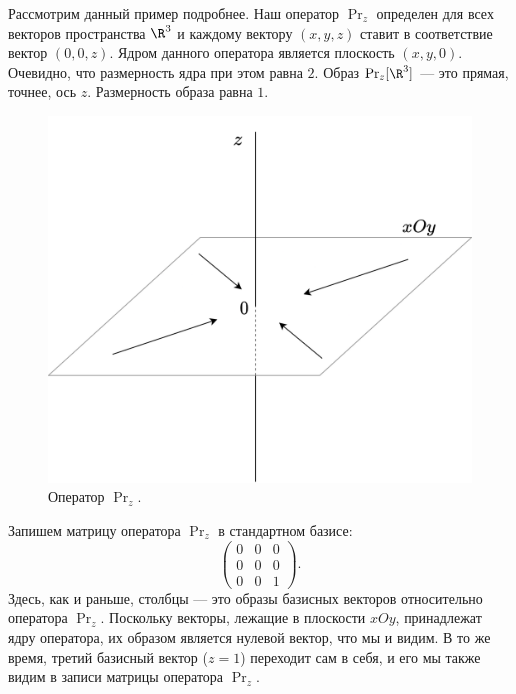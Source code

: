\begin{enumerate}
Рассмотрим данный пример подробнее. Наш оператор $\Pr_z$ определен для всех векторов пространства $\R^3$ и каждому вектору $(x,y,z)$ ставит в соответствие вектор $(0,0,z)$. Ядром данного оператора является плоскость $(x,y,0)$. Очевидно, что размерность ядра при этом равна $2$. Образ $\Pr_z[\R^3]$ --- это прямая, точнее, ось $z$. Размерность образа равна $1$.

\begin{figure}[hbt!]
\begin{center}
\includegraphics[scale=0.2]{ProjZ.png}
\end{center}\caption{Оператор $\Pr_z$.}\label{ProjZ}
\end{figure}

Запишем матрицу оператора $\Pr_z$ в стандартном базисе:
$$
\begin{pmatrix}
0 & 0 & 0 \\
0 & 0 & 0 \\
0 & 0 & 1 
\end{pmatrix}.
$$
Здесь, как и раньше, столбцы --- это образы базисных векторов относительно оператора $\Pr_z$. Поскольку векторы, лежащие в плоскости $xOy$, принадлежат ядру оператора, их образом является нулевой вектор, что мы и видим. В то же время, третий базисный вектор ($z=1$) переходит сам в себя, и его мы также видим в записи матрицы оператора $\Pr_z$.





\end{enumerate}
